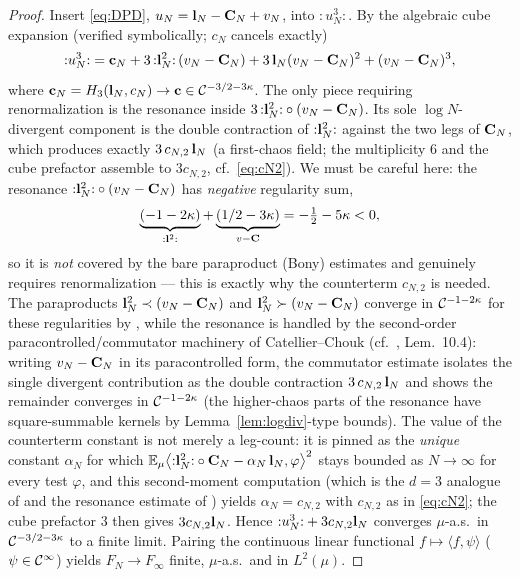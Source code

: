 \begin{proof}
Insert \eqref{eq:DPD}, $u_N=\mathbf{l}_N-\mathbf{C}_N+v_N$, into ${:}u_N^3{:}$. By the
algebraic cube expansion (verified symbolically; $c_N$ cancels exactly)
\begin{equation}\label{eq:cubeexp}
{:}u_N^3{:}=\mathbf{c}_N+3\,{:}\mathbf{l}_N^2{:}\,(v_N-\mathbf{C}_N)+3\,\mathbf{l}_N(v_N-\mathbf{C}_N)^2+(v_N-\mathbf{C}_N)^3,
\end{equation}
where $\mathbf{c}_N=H_3(\mathbf{l}_N,c_N)\to\mathbf{c}\in\mathcal{C}^{-3/2-3\kappa}$. The only
piece requiring renormalization is the resonance inside
$3\,{:}\mathbf{l}_N^2{:}\circ(v_N-\mathbf{C}_N)$. Its sole $\log N$-divergent component is
the double contraction of ${:}\mathbf{l}_N^2{:}$ against the two legs of $\mathbf{C}_N$,
which produces exactly $3\,c_{N,2}\,\mathbf{l}_N$ (a first-chaos field; the multiplicity
$6$ and the cube prefactor assemble to $3c_{N,2}$, cf.\ \eqref{eq:cN2}). We must be
careful here: the resonance ${:}\mathbf{l}_N^2{:}\circ(v_N-\mathbf{C}_N)$ has \emph{negative}
regularity sum,
\[
\underbrace{(-1-2\kappa)}_{{:}\mathbf{l}^2{:}}+\underbrace{(1/2-3\kappa)}_{v-\mathbf{C}}
=-\tfrac12-5\kappa<0,
\]
so it is \emph{not} covered by the bare paraproduct (Bony) estimates and genuinely
requires renormalization --- this is exactly why the counterterm $c_{N,2}$ is needed. The
paraproducts $\mathbf{l}_N^2\prec(v_N-\mathbf{C}_N)$ and
$\mathbf{l}_N^2\succ(v_N-\mathbf{C}_N)$ converge in $\mathcal{C}^{-1-2\kappa}$ for these
regularities by \cite{GIP15}, while the resonance is handled by the second-order
paracontrolled/commutator machinery of Catellier--Chouk \cite{CC18} (cf.\ \cite{GIP15},
Lem.~10.4): writing $v_N-\mathbf{C}_N$ in its paracontrolled form, the commutator estimate
isolates the single divergent contribution as the double contraction
$3\,c_{N,2}\,\mathbf{l}_N$ and shows the remainder converges in $\mathcal{C}^{-1-2\kappa}$
(the higher-chaos parts of the resonance have square-summable kernels by
Lemma~\ref{lem:logdiv}-type bounds). The value of the counterterm constant is not merely
a leg-count: it is pinned as the \emph{unique} constant $\alpha_N$ for which
$\mathbb{E}_\mu\bigl\langle{:}\mathbf{l}_N^2{:}\circ\mathbf{C}_N-\alpha_N\,\mathbf{l}_N,\varphi\bigr\rangle^2$
stays bounded as $N\to\infty$ for every test $\varphi$, and this second-moment
computation (which is the $d=3$ analogue of \cite[Lems.~3.11--3.12]{HKN24} and the
resonance estimate of \cite{CC18}) yields $\alpha_N=c_{N,2}$ with $c_{N,2}$ as in
\eqref{eq:cN2}; the cube prefactor $3$ then gives $3c_{N,2}\mathbf{l}_N$. Hence
${:}u_N^3{:}+3c_{N,2}\mathbf{l}_N$ converges $\mu$-a.s.\ in $\mathcal{C}^{-3/2-3\kappa}$ to a
finite limit. Pairing the continuous linear functional $f\mapsto\langle f,\psi\rangle$
($\psi\in\mathcal{C}^\infty$) yields $F_N\to F_\infty$ finite, $\mu$-a.s.\ and in $L^2(\mu)$.
\end{proof}

